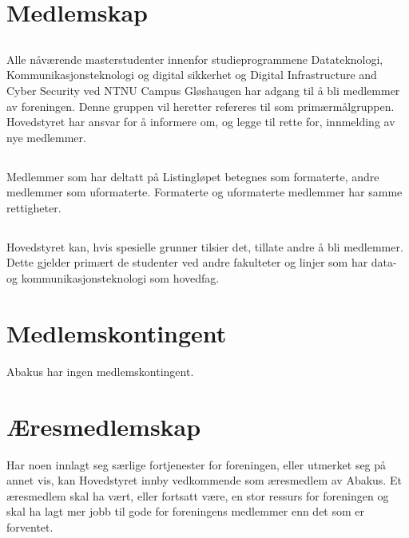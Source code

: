 \section{Medlemskap}

\subsection{}
Alle nåværende masterstudenter innenfor studieprogrammene Datateknologi, Kommunikasjonsteknologi
og digital sikkerhet og Digital Infrastructure and Cyber Security
ved NTNU Campus Gløshaugen har adgang til å bli medlemmer av foreningen.
Denne gruppen vil heretter refereres til som primærmålgruppen. Hovedstyret har ansvar
for å informere om, og legge til rette for, innmelding av nye medlemmer.

\subsection{}
Medlemmer som har deltatt på Listingløpet betegnes som formaterte, andre
medlemmer som uformaterte. Formaterte og uformaterte medlemmer har samme
rettigheter.

\subsection{}
Hovedstyret kan, hvis spesielle grunner tilsier det, tillate andre å bli
medlemmer. Dette gjelder primært de studenter ved andre fakulteter og linjer
som har data- og kommunikasjonsteknologi som hovedfag.

\section{Medlemskontingent}
Abakus har ingen medlemskontingent.

\section{Æresmedlemskap}
Har noen innlagt seg særlige fortjenester for foreningen, eller utmerket seg
på annet vis, kan Hovedstyret innby vedkommende som æresmedlem av Abakus. Et
æresmedlem skal ha vært, eller fortsatt være, en stor ressurs for foreningen og
skal ha lagt mer jobb til gode for foreningens medlemmer enn det som er forventet.
